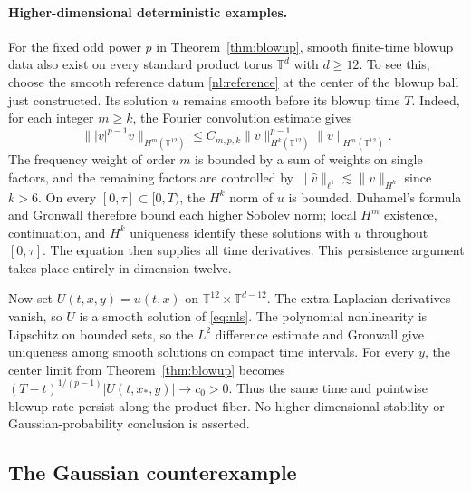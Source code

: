 \documentclass[11pt]{article}
\numberwithin{equation}{section}
\theoremstyle{definition}
\theoremstyle{remark}
\begin{document}
\paragraph{Higher-dimensional deterministic examples.}
For the fixed odd power $p$ in Theorem~\ref{thm:blowup}, smooth
finite-time blowup data also exist on every standard product torus
$\mathbb T^d$ with $d\ge12$. To see this, choose the smooth reference
datum \eqref{nl:reference} at the center of the blowup ball just
constructed. Its solution $u$ remains smooth before its blowup time $T$.
Indeed, for each integer $m\ge k$, the Fourier convolution estimate gives
\[
 \big\||v|^{p-1}v\big\|_{H^m(\mathbb T^{12})}
 \le C_{m,p,k}\|v\|_{H^k(\mathbb T^{12})}^{p-1}
                 \|v\|_{H^m(\mathbb T^{12})}.
\]
The frequency weight of order $m$ is bounded by a sum of weights on
single factors, and the remaining factors are controlled by
$\|\widehat v\|_{\ell^1}\lesssim\|v\|_{H^k}$ since $k>6$.
On every $[0,\tau]\subset[0,T)$, the $H^k$ norm of $u$ is bounded.
Duhamel's formula and Gronwall therefore bound each higher Sobolev norm;
local $H^m$ existence, continuation, and $H^k$ uniqueness identify these
solutions with $u$ throughout $[0,\tau]$. The equation then supplies all
time derivatives. This persistence argument takes place entirely in
dimension twelve.

Now set $U(t,x,y)=u(t,x)$ on
$\mathbb T^{12}\times\mathbb T^{d-12}$. The extra Laplacian derivatives
vanish, so $U$ is a smooth solution of \eqref{eq:nls}.
The polynomial nonlinearity is Lipschitz on bounded sets, so the $L^2$
difference estimate and Gronwall give uniqueness among smooth solutions
on compact time intervals.
For every $y$, the center limit from Theorem~\ref{thm:blowup} becomes
$(T-t)^{1/(p-1)}|U(t,x_*,y)|\to c_0>0$.
Thus the same time and pointwise blowup rate persist along the product
fiber. No higher-dimensional stability or Gaussian-probability conclusion
is asserted.

\subsection{The Gaussian counterexample}
\end{document}
